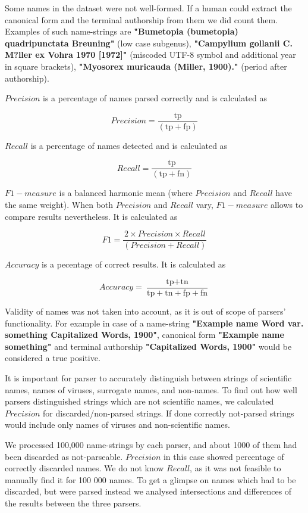 \documentclass{bmcart}
\begin{document}
Some names in the dataset were not well-formed. If a human could extract the
canonical form and the terminal authorship from them we did count them.
Examples of such name-strings are \textbf{"Bumetopia (bumetopia)
quadripunctata Breuning"} (low case subgenus), \textbf{"Campylium gollanii C.
M?ller ex Vohra 1970 [1972]"} (miscoded UTF-8 symbol and additional year in
square brackets), \textbf{"Myosorex muricauda (Miller, 1900)."} (period after
authorship).

$Precision$ is a percentage of names parsed correctly and is calculated as

\[Precision = \dfrac{\text{tp}}{(\text{tp} + \text{fp})}\]

$Recall$ is a percentage of names detected and is calculated as

\[Recall = \dfrac{\text{tp}}{(\text{tp} + \text{fn})}\]

$F1-measure$ is a balanced harmonic mean (where $Precision$ and $Recall$ have
the same weight). When both $Precision$ and $Recall$ vary, $F1-measure$ allows
to compare results nevertheless. It is calculated as

\[F1 = \dfrac{2 \times Precision \times Recall}{(Precision + Recall)}\]

$Accuracy$ is a pecentage of correct results. It is calculated as

\[Accuracy = \dfrac{\text{tp} + \text{tn}}
  {\text{tp} + \text{tn} + \text{fp} + \text{fn}}\]

Validity of names was not taken into account, as it is out of scope of
parsers' functionality. For example in case of a name-string \textbf{"Example
name Word var.  something Capitalized Words, 1900"}, canonical form
\textbf{"Example name something"} and terminal authorship \textbf{"Capitalized
Words, 1900"} would be considered a true positive.

It is important for parser to accurately distinguish between strings of
scientific names, names of viruses, surrogate names, and non-names. To find
out how well parsers distinguished strings which are not scientific names, we
calculated $Precision$ for discarded/non-parsed strings. If done correctly
not-parsed strings would include only names of viruses and non-scientific
names.

We processed 100,000 name-strings by each parser, and about 1000 of them had
been discarded as not-parseable. $Precision$ in this case showed percentage of
correctly discarded names.  We do not know $Recall$, as it was not feasible to
manually find it for 100 000 names. To get a glimpse on names which had to be
discarded, but were parsed instead we analysed intersections and differences
of the results between the three parsers.
\end{document}
